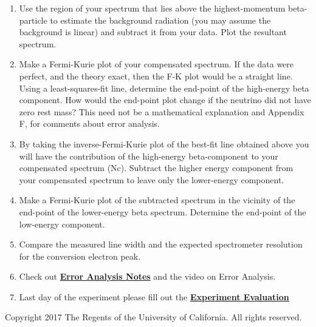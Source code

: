 \documentclass{../lab}
\begin{document}
\begin{enumerate}
\begin{enumerate}
        \item Use the region of your spectrum that lies above the highest-momentum beta-particle to estimate the background radiation (you may assume the background is linear) and subtract it from your data. Plot the resultant spectrum.

        \item Make a Fermi-Kurie plot of your compensated spectrum. If the data were perfect, and the theory exact, then the F-K plot would be a straight line. Using a least-squares-fit line, determine the end-point of the high-energy beta component. How would the end-point plot change if the neutrino did not have zero rest mass? This need not be a mathematical explanation and Appendix F, for comments about error analysis.

        \item By taking the inverse-Fermi-Kurie plot of the best-fit line obtained above you will have the contribution of the high-energy beta-component to your compensated spectrum (Nc). Subtract the higher energy component from your compensated spectrum to leave only the lower-energy component.

        \item Make a Fermi-Kurie plot of the subtracted spectrum in the vicinity of the end-point of the lower-energy beta spectrum. Determine the end-point of the low-energy component.

        \item Compare the measured line width and the expected spectrometer resolution for the conversion electron peak.

        \item Check out \href{\ErrorAnalysisNotes}{\textbf{\textbf{Error Analysis Notes}}} and the video on Error Analysis.

        \item Last day of the experiment please fill out the \href{\ExperimentEvaluation}{\textbf{Experiment Evaluation}}

    \end{enumerate}

\end{enumerate}

Copyright 2017 The Regents of the University of California. All rights reserved.
\end{document}
